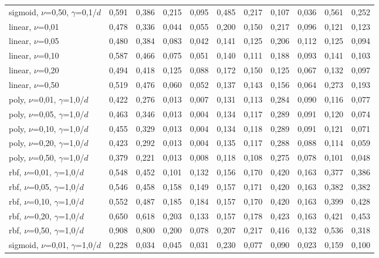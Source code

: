 \begin{longtable}{lrrrrrrrrrr}
sigmoid, $\nu$=0,50, $\gamma$=0,1/$d$ & 0,591 & 0,386 & 0,215 & 0,095 & 0,485 & 0,217 & 0,107 & 0,036 & 0,561 & 0,252 \\
linear, $\nu$=0,01 & 0,478 & 0,336 & 0,044 & 0,055 & 0,200 & 0,150 & 0,217 & 0,096 & 0,121 & 0,123 \\
linear, $\nu$=0,05 & 0,480 & 0,384 & 0,083 & 0,042 & 0,141 & 0,125 & 0,206 & 0,112 & 0,125 & 0,094 \\
linear, $\nu$=0,10 & 0,587 & 0,466 & 0,075 & 0,051 & 0,140 & 0,111 & 0,188 & 0,093 & 0,141 & 0,103 \\
linear, $\nu$=0,20 & 0,494 & 0,418 & 0,125 & 0,088 & 0,172 & 0,150 & 0,125 & 0,067 & 0,132 & 0,097 \\
linear, $\nu$=0,50 & 0,519 & 0,476 & 0,060 & 0,052 & 0,137 & 0,143 & 0,156 & 0,064 & 0,273 & 0,193 \\
poly, $\nu$=0,01, $\gamma$=1,0/$d$ & 0,422 & 0,276 & 0,013 & 0,007 & 0,131 & 0,113 & 0,284 & 0,090 & 0,116 & 0,077 \\
poly, $\nu$=0,05, $\gamma$=1,0/$d$ & 0,463 & 0,346 & 0,013 & 0,004 & 0,134 & 0,117 & 0,289 & 0,091 & 0,120 & 0,074 \\
poly, $\nu$=0,10, $\gamma$=1,0/$d$ & 0,455 & 0,329 & 0,013 & 0,004 & 0,134 & 0,118 & 0,289 & 0,091 & 0,121 & 0,071 \\
poly, $\nu$=0,20, $\gamma$=1,0/$d$ & 0,423 & 0,292 & 0,013 & 0,004 & 0,135 & 0,117 & 0,288 & 0,088 & 0,114 & 0,059 \\
poly, $\nu$=0,50, $\gamma$=1,0/$d$ & 0,379 & 0,221 & 0,013 & 0,008 & 0,118 & 0,108 & 0,275 & 0,078 & 0,101 & 0,048 \\
rbf, $\nu$=0,01, $\gamma$=1,0/$d$ & 0,548 & 0,452 & 0,101 & 0,132 & 0,156 & 0,170 & 0,420 & 0,163 & 0,377 & 0,386 \\
rbf, $\nu$=0,05, $\gamma$=1,0/$d$ & 0,546 & 0,458 & 0,158 & 0,149 & 0,157 & 0,171 & 0,420 & 0,163 & 0,382 & 0,382 \\
rbf, $\nu$=0,10, $\gamma$=1,0/$d$ & 0,552 & 0,487 & 0,185 & 0,184 & 0,157 & 0,170 & 0,420 & 0,163 & 0,399 & 0,428 \\
rbf, $\nu$=0,20, $\gamma$=1,0/$d$ & 0,650 & 0,618 & 0,203 & 0,133 & 0,157 & 0,178 & 0,423 & 0,163 & 0,421 & 0,453 \\
rbf, $\nu$=0,50, $\gamma$=1,0/$d$ & 0,908 & 0,800 & 0,200 & 0,078 & 0,207 & 0,217 & 0,416 & 0,132 & 0,536 & 0,318 \\
sigmoid, $\nu$=0,01, $\gamma$=1,0/$d$ & 0,228 & 0,034 & 0,045 & 0,031 & 0,230 & 0,077 & 0,090 & 0,023 & 0,159 & 0,100 \\

\end{longtable}
